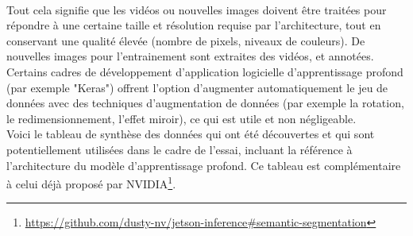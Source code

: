 \vspace{\baselineskip}
\\
\noindent Tout cela signifie que les vidéos ou nouvelles images doivent être traitées pour répondre à une certaine taille et résolution requise par l'architecture, tout en conservant une qualité élevée (nombre de pixels, niveaux de couleurs). De nouvelles images pour l'entrainement sont extraites des vidéos, et annotées. 
\vspace{\baselineskip}
\\
\noindent Certains cadres de développement d'application logicielle d'apprentissage profond (par exemple "Keras") offrent l'option d'augmenter automatiquement le jeu de données avec des techniques d'augmentation de données (par exemple la rotation, le redimensionnement, l'effet miroir), ce qui est utile et non négligeable.
\vspace{\baselineskip}
\\
\noindent Voici le tableau de synthèse des données qui ont été découvertes et qui sont potentiellement utilisées dans le cadre de l'essai, incluant la référence à l'architecture du modèle d'apprentissage profond. Ce tableau est complémentaire à celui déjà proposé par NVIDIA\footnote{\url{https://github.com/dusty-nv/jetson-inference#semantic-segmentation}}.

